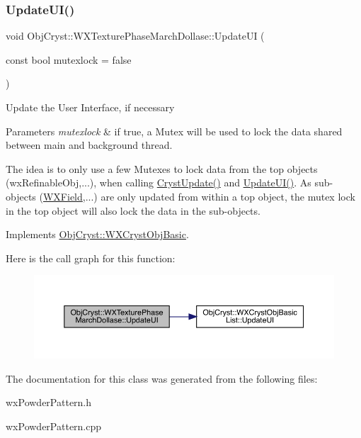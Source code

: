 \subsubsection{\texorpdfstring{UpdateUI()}{UpdateUI()}}
{\footnotesize\ttfamily void Obj\+Cryst\+::\+W\+X\+Texture\+Phase\+March\+Dollase\+::\+Update\+UI (\begin{DoxyParamCaption}\item[{const bool}]{mutexlock = {\ttfamily false} }\end{DoxyParamCaption})\hspace{0.3cm}{\ttfamily [virtual]}}

Update the User Interface, if necessary


\begin{DoxyParams}{Parameters}
{\em mutexlock} & if true, a Mutex will be used to lock the data shared between main and background thread.\\
\hline
\end{DoxyParams}
The idea is to only use a few Mutexes to lock data from the top objects (wx\+Refinable\+Obj,...), when calling \mbox{\hyperlink{class_obj_cryst_1_1_w_x_texture_phase_march_dollase_a9f7baf1967a22db565f84f354d0eaa88}{Cryst\+Update()}} and \mbox{\hyperlink{class_obj_cryst_1_1_w_x_texture_phase_march_dollase_ab9dffa65029bbd9d9c07e07e5b2ccf99}{Update\+U\+I()}}. As sub-\/objects (\mbox{\hyperlink{class_obj_cryst_1_1_w_x_field}{W\+X\+Field}},...) are only updated from within a top object, the mutex lock in the top object will also lock the data in the sub-\/objects. 

Implements \mbox{\hyperlink{class_obj_cryst_1_1_w_x_cryst_obj_basic_a3818940b7031ff7e45cf2178c4a99c90}{Obj\+Cryst\+::\+W\+X\+Cryst\+Obj\+Basic}}.

Here is the call graph for this function\+:
\nopagebreak
\begin{figure}[H]
\begin{center}
\leavevmode
\includegraphics[width=350pt]{class_obj_cryst_1_1_w_x_texture_phase_march_dollase_ab9dffa65029bbd9d9c07e07e5b2ccf99_cgraph}
\end{center}
\end{figure}


The documentation for this class was generated from the following files\+:\begin{DoxyCompactItemize}
\item 
wx\+Powder\+Pattern.\+h\item 
wx\+Powder\+Pattern.\+cpp\end{DoxyCompactItemize}
